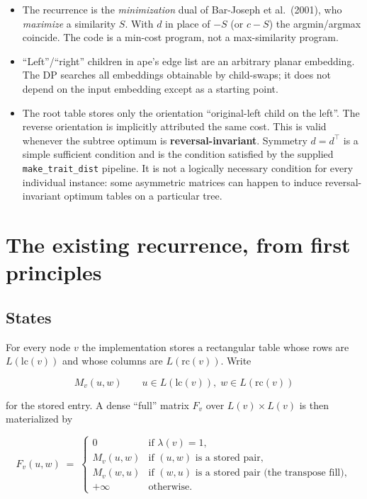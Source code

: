 \documentclass[11pt]{article}
\theoremstyle{plain}
\newcommand{\lc}{\mathrm{lc}}
\newcommand{\rc}{\mathrm{rc}}
\begin{document}
\begin{itemize}
\item The recurrence is the \emph{minimization} dual of Bar-Joseph et al.\
  (2001), who \emph{maximize} a similarity \(S\). With \(d\) in place of \(-S\)
  (or \(c-S\)) the argmin/argmax coincide. The code is a min-cost program, not
  a max-similarity program.
\item ``Left''/``right'' children in ape's edge list are an arbitrary planar
  embedding. The DP searches all embeddings obtainable by child-swaps; it does
  not depend on the input embedding except as a starting point.
\item The root table stores only the orientation ``original-left child on the
  left''. The reverse orientation is implicitly attributed the same cost. This
  is valid whenever the subtree optimum is \textbf{reversal-invariant}.
  Symmetry \(d=d^\top\) is a simple sufficient condition and is the condition
  satisfied by the supplied \texttt{make\_trait\_dist} pipeline. It is not a
  logically necessary condition for every individual instance: some asymmetric
  matrices can happen to induce reversal-invariant optimum tables on a
  particular tree.
\end{itemize}

\section{The existing recurrence, from first principles}
\label{sec:recurrence}

\subsection{States}

For every node \(v\) the implementation stores a rectangular table whose rows
are \(L(\lc(v))\) and whose columns are \(L(\rc(v))\). Write

\[
M_v(u,w)
\qquad
u \in L(\lc(v)),\;
w \in L(\rc(v))
\]

for the stored entry. A dense ``full'' matrix \(F_v\) over \(L(v) \times L(v)\)
is then materialized by

\[
F_v(u,w)
\;=\;
\begin{cases}
0 & \text{if }\lambda(v)=1,\\
M_v(u,w) & \text{if }(u,w)\text{ is a stored pair},\\
M_v(w,u) & \text{if }(w,u)\text{ is a stored pair (the transpose fill)},\\
+\infty & \text{otherwise}.
\end{cases}
\]
\end{document}

